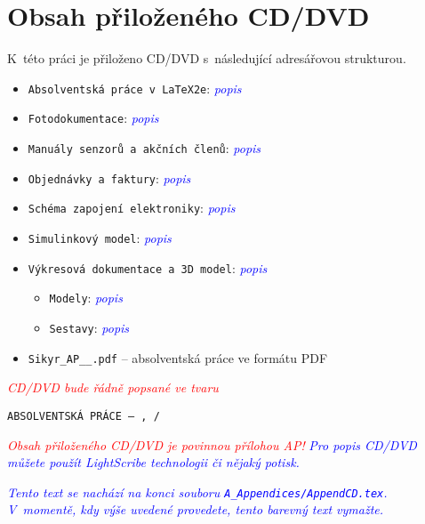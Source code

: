 ﻿\chapter{Obsah přiloženého CD/DVD \label{ch:ApendCD}}





K~této práci je přiloženo CD/DVD s~následující adresářovou strukturou.
\begin{itemize}
    \item \texttt{Absolventská práce v \LaTeX2e}\?: 
        \textcolor{blue}{\em popis}
    \item \texttt{Fotodokumentace}\?: 
        \textcolor{blue}{\em popis}
    \item \texttt{Manuály senzorů a akčních členů}\?: 
        \textcolor{blue}{\em popis}
    \item \texttt{Objednávky a faktury}\?: 
        \textcolor{blue}{\em popis}
    \item \texttt{Schéma zapojení elektroniky}\?: 
        \textcolor{blue}{\em popis}
    \item \texttt{Simulinkový model}\?: 
        \textcolor{blue}{\em popis}
    \item \texttt{Výkresová dokumentace a 3D model}\?: 
        \textcolor{blue}{\em popis}
    \begin{itemize}
        \item \texttt{Modely}\?: \textcolor{blue}{\em popis}
        \item \texttt{Sestavy}\?: \textcolor{blue}{\em popis}
    \end{itemize}
    \item \texttt{Sikyr\_AP\_\the\value{YearOld}\_\Year.pdf} -- absolventská práce ve formátu PDF
\end{itemize}





\noindent \textcolor{red}{\em CD/DVD bude řádně popsané ve tvaru}
\begin{center}
\texttt{ABSOLVENTSKÁ PRÁCE -- \Author, \the\value{YearOld}/\Year}
\end{center}
\textcolor{red}{\em Obsah přiloženého CD/DVD je povinnou přílohou AP!\/} \textcolor{blue}{\em Pro popis CD/DVD můžete použít LightScribe technologii či nějaký potisk.\/}

\textcolor{blue}{\em Tento text se nachází na konci souboru \texttt{A\_Appendices/AppendCD.tex}. V~momentě, kdy výše uvedené provedete, tento barevný text vymažte.\/}
